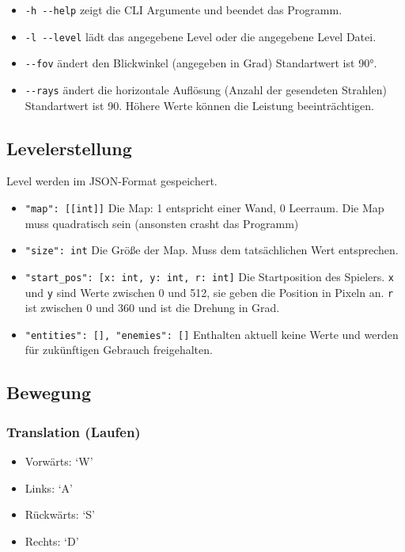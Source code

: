 \documentclass[a4paper,titlepage]{article}
\begin{document}
\begin{itemize}
	\item \verb|-h --help| zeigt die CLI Argumente und beendet das Programm.
	\item \verb|-l --level| lädt das angegebene Level oder die angegebene Level Datei.
	\item \verb|--fov| ändert den Blickwinkel (angegeben in Grad) Standartwert ist 90°.
	\item \verb|--rays| ändert die horizontale Auflösung (Anzahl der gesendeten Strahlen) Standartwert ist 90. Höhere Werte können die Leistung beeinträchtigen.
\end{itemize}

\subsection{Levelerstellung}
Level werden im JSON-Format gespeichert.
\begin{itemize}
	\item \verb|"map": [[int]]| Die Map: 1 entspricht einer Wand, 0 Leerraum. Die Map muss quadratisch sein (ansonsten crasht das Programm)
	\item \verb|"size": int| Die Größe der Map. Muss dem tatsächlichen Wert entsprechen.
	\item \verb|"start_pos": [x: int, y: int, r: int]| Die Startposition des Spielers. \verb|x| und \verb|y| sind Werte zwischen 0 und 512, sie geben die Position in Pixeln an. \verb|r| ist zwischen 0 und 360 und ist die Drehung in Grad.
	\item \verb|"entities": [], "enemies": []| Enthalten aktuell keine Werte und werden für zukünftigen Gebrauch freigehalten.
	
\end{itemize}

\subsection{Bewegung}

\subsubsection*{Translation (Laufen)}
\begin{itemize}
\item Vorwärts: `W'
\item Links: `A'
\item Rückwärts: `S'
\item Rechts: `D'
\end{itemize}
\end{document}
